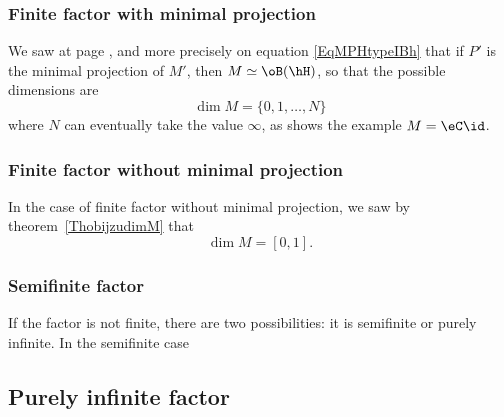 					\subsubsection{Finite factor with minimal projection}

We saw at page \pageref{PgtypeIonavu}, and more precisely on equation \eqref{EqMPHtypeIBh} that if $P'$ is the minimal projection of $M'$, then $M\simeq\oB(\hH)$, so that the possible dimensions are
\begin{equation}
	\dim M=\{ 0,1,\ldots,N \}
\end{equation}
where $N$ can eventually take the value $\infty$, as shows the example $M=\eC\id$.

					\subsubsection{Finite factor without minimal projection}

In the case of finite factor without minimal projection, we saw by theorem~\ref{ThobijzudimM} that
\begin{equation}
	\dim M=[0,1].
\end{equation}

					\subsubsection{Semifinite factor}

If the factor is not finite, there are two possibilities: it is semifinite or purely infinite. In the semifinite case

					\subsection{Purely infinite factor}

